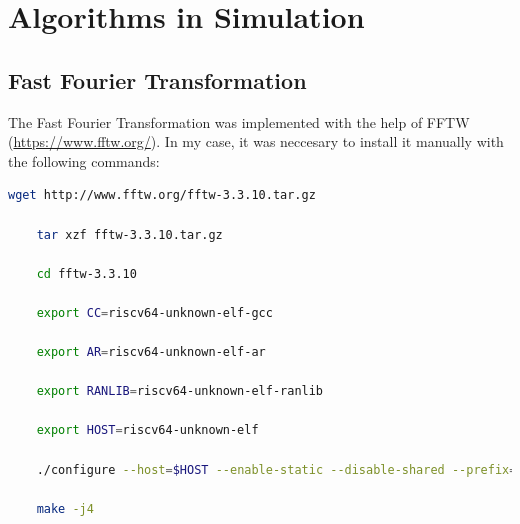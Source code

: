 \documentclass{article}
\begin{document}
{\section*{Algorithms in Simulation}
\subsection*{Fast Fourier Transformation}
The Fast Fourier Transformation was implemented with the help of FFTW (\url{https://www.fftw.org/}). In my case, it was neccesary to install it manually with the following commands:\\
\begin{lstlisting}[language=bash]
    wget http://www.fftw.org/fftw-3.3.10.tar.gz

    tar xzf fftw-3.3.10.tar.gz

    cd fftw-3.3.10

    export CC=riscv64-unknown-elf-gcc

    export AR=riscv64-unknown-elf-ar

    export RANLIB=riscv64-unknown-elf-ranlib

    export HOST=riscv64-unknown-elf

    ./configure --host=$HOST --enable-static --disable-shared --prefix=$(pwd)/install

    make -j4


\end{lstlisting}}
\end{document}
